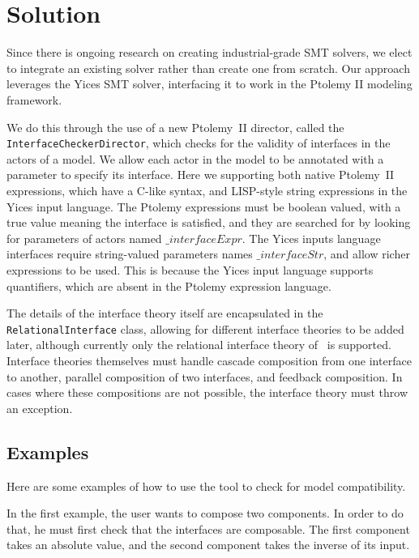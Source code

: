 \documentclass[preprint,11pt]{sigplanconf}
\begin{document}
\section{Solution}
Since there is ongoing research on creating industrial-grade SMT solvers,
we elect to integrate an existing solver rather than create one from scratch.
Our approach leverages the Yices\cite{yices} SMT solver, interfacing it to
work in the Ptolemy II\cite{ptII} modeling framework.

We do this through the use of a new Ptolemy~II director, called the
\texttt{InterfaceCheckerDirector}, which checks for the validity of interfaces
in the actors of a model.
We allow each actor in the model to be annotated with a parameter to specify
its interface.
Here we supporting both native Ptolemy~II expressions, which have a C-like
syntax, and LISP-style string expressions in the Yices input language.
The Ptolemy expressions must be boolean valued, with a true value meaning the
interface is satisfied, and they are searched for by looking for parameters of
actors named $\_interfaceExpr$.
The Yices inputs language interfaces require string-valued parameters names
$\_interfaceStr$, and allow richer expressions to be used.
This is because the Yices input language supports quantifiers, which are
absent in the Ptolemy expression language.

The details of the interface theory itself are encapsulated in the
\texttt{RelationalInterface} class, allowing for different interface theories
to be added later, although currently only the relational interface theory
of~\cite{relationalInterfaces} is supported.
Interface theories themselves must handle cascade composition from one
interface to another, parallel composition of two interfaces, and feedback
composition.  In cases where these compositions are not possible, the
interface theory must throw an exception.

\subsection{Examples}
Here are some examples of how to use the tool to check for model compatibility.

In the first example, the user wants to compose two components.
In order to do that, he must first check that the interfaces are composable. 
The first component takes an absolute value, and the second component takes the
inverse of its input.
\end{document}
